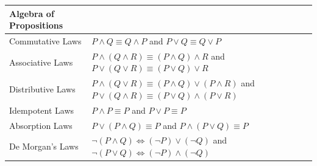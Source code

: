 \documentclass[]{book}
\begin{document}
\begin{longtable}[]{@{}ll@{}}
\toprule
\begin{minipage}[b]{0.44\columnwidth}\raggedright
Algebra of Propositions\strut
\end{minipage} & \begin{minipage}[b]{0.50\columnwidth}\raggedright
\strut
\end{minipage}\tabularnewline
\midrule
\endhead
\begin{minipage}[t]{0.44\columnwidth}\raggedright
Commutative Laws\strut
\end{minipage} & \begin{minipage}[t]{0.50\columnwidth}\raggedright
\(P\land Q\equiv Q \land P\) and \(P\lor Q\equiv Q \lor P\)\strut
\end{minipage}\tabularnewline
\begin{minipage}[t]{0.44\columnwidth}\raggedright
Associative Laws\strut
\end{minipage} & \begin{minipage}[t]{0.50\columnwidth}\raggedright
\(P\land (Q \land R)\equiv (P\land Q) \land R\) and \(P\lor (Q \lor R)\equiv (P\lor Q) \lor R\)\strut
\end{minipage}\tabularnewline
\begin{minipage}[t]{0.44\columnwidth}\raggedright
Distributive Laws\strut
\end{minipage} & \begin{minipage}[t]{0.50\columnwidth}\raggedright
\(P\land (Q \lor R)\equiv (P\land Q) \lor (P\land R)\) and \(P\lor (Q \land R)\equiv (P\lor Q) \land (P\lor R)\)\strut
\end{minipage}\tabularnewline
\begin{minipage}[t]{0.44\columnwidth}\raggedright
Idempotent Laws\strut
\end{minipage} & \begin{minipage}[t]{0.50\columnwidth}\raggedright
\(P\land P\equiv P\) and \(P\lor P\equiv P\)\strut
\end{minipage}\tabularnewline
\begin{minipage}[t]{0.44\columnwidth}\raggedright
Absorption Laws\strut
\end{minipage} & \begin{minipage}[t]{0.50\columnwidth}\raggedright
\(P\lor (P \land Q)\equiv P\) and \(P\land (P \lor Q)\equiv P\)\strut
\end{minipage}\tabularnewline
\begin{minipage}[t]{0.44\columnwidth}\raggedright
De Morgan's Laws\strut
\end{minipage} & \begin{minipage}[t]{0.50\columnwidth}\raggedright
\(\lnot (P\land Q) \Leftrightarrow (\lnot P) \lor(\lnot Q)\) and \(\lnot (P\lor Q) \Leftrightarrow (\lnot P) \land (\lnot Q)\)\strut
\end{minipage}\tabularnewline
\bottomrule
\end{longtable}
\end{document}
